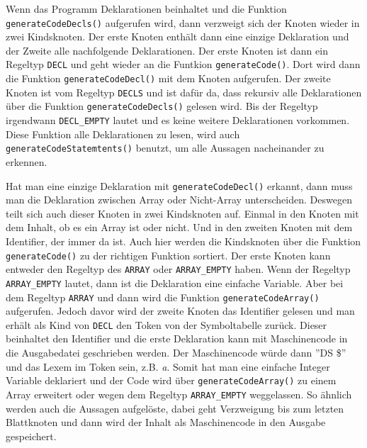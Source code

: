 

Wenn das Programm Deklarationen beinhaltet und die Funktion \texttt{generateCodeDecls()} aufgerufen wird, dann verzweigt sich der Knoten wieder in zwei Kindsknoten. Der erste Knoten enthält dann eine einzige Deklaration und der Zweite alle nachfolgende Deklarationen. Der erste Knoten ist dann ein Regeltyp \texttt{DECL} und geht wieder an die Funtkion \texttt{generateCode()}. Dort wird dann die Funktion \texttt{generateCodeDecl()} mit dem Knoten aufgerufen. Der zweite Knoten ist vom Regeltyp \texttt{DECLS} und ist dafür da, dass rekursiv alle Deklarationen über die Funktion \texttt{generateCodeDecls()} gelesen wird. Bis der Regeltyp irgendwann \texttt{DECL\_EMPTY} lautet und es keine weitere Deklarationen vorkommen. Diese Funktion alle Deklarationen zu lesen, wird auch \texttt{generateCodeStatemtents()} benutzt, um alle Aussagen nacheinander zu erkennen.



Hat man eine einzige Deklaration mit \texttt{generateCodeDecl()} erkannt, dann muss man die Deklaration zwischen Array oder  Nicht-Array unterscheiden. Deswegen teilt sich auch dieser Knoten in zwei Kindsknoten auf. Einmal in den Knoten mit dem Inhalt, ob es ein Array ist oder nicht. Und in den zweiten Knoten mit dem Identifier, der immer da ist. Auch hier werden die Kindsknoten über die Funktion \texttt{generateCode()} zu der richtigen Funktion sortiert. Der erste Knoten kann entweder den Regeltyp des \texttt{ARRAY} oder \texttt{ARRAY\_EMPTY} haben. Wenn der Regeltyp \texttt{ARRAY\_EMPTY} lautet, dann ist die Deklaration eine einfache Variable. Aber bei dem Regeltyp \texttt{ARRAY} und dann wird die Funktion \texttt{generateCodeArray()} aufgerufen. Jedoch davor wird der zweite Knoten das Identifier gelesen und man erhält als Kind von \texttt{DECL} den Token von der Symboltabelle zurück. Dieser beinhaltet den Identifier und die erste Deklaration kann mit Maschinencode in die Ausgabedatei geschrieben werden. Der Maschinencode würde dann ''DS \$'' und das Lexem im Token sein, z.B. \emph{a}. Somit hat man eine einfache Integer Variable deklariert und der Code wird über \texttt{generateCodeArray()} zu einem Array erweitert oder wegen dem Regeltyp \texttt{ARRAY\_EMPTY} weggelassen. So ähnlich werden auch die Aussagen aufgelöste, dabei geht Verzweigung bis zum letzten Blattknoten und dann wird der Inhalt als Maschinencode in den Ausgabe gespeichert.



